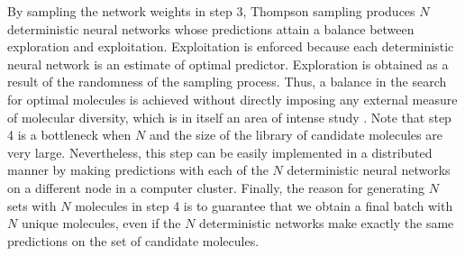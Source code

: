 By sampling the network weights in step 3, Thompson sampling produces $N$ deterministic neural networks whose predictions attain a balance between exploration and exploitation. Exploitation is enforced because each deterministic neural network is an estimate of optimal predictor. Exploration is obtained as a result of the randomness of the sampling process.  Thus, a balance in the search for optimal molecules is achieved without directly imposing any external measure of molecular diversity, which is in itself an area of intense study \cite{Maldonado_2006}.  Note that step 4 is a bottleneck when $N$ and the size of the library of candidate molecules are very large. Nevertheless, this step can be easily implemented in a distributed manner by making predictions with each of the $N$ deterministic neural networks on a different node in a computer cluster. Finally, the reason for generating $N$ sets with $N$ molecules in step 4 is to guarantee that we obtain a final batch with $N$ unique molecules, even if the $N$ deterministic networks make exactly the same predictions on the set of candidate molecules.